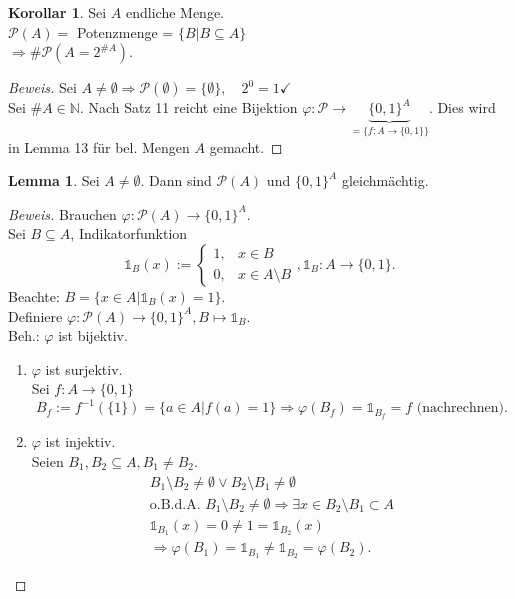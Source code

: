 \documentclass[12pt,a4paper,titlepage]{article} %
\theoremstyle{definition}
\newtheorem{kor}[satz]{Korollar}
\newtheorem{lem}[satz]{Lemma}
\theoremstyle{remark}
\newenvironment{bew}{\begin{proof}[Beweis]}{\end{proof}}
\newcommand{\N}{\mathbb{N}}
\begin{document}
\begin{kor}
	Sei \(A\) endliche Menge. \\
	\(\mathcal{P}(A) = \) Potenzmenge = \(\{B | B \subseteq A\}\)\\
	\(\Rightarrow \#\mathcal{P}(A = 2^{\#A}) \).
\end{kor}
\begin{bew}
	Sei \(A\neq \emptyset \Rightarrow\mathcal{P}(\emptyset) = \{\emptyset\}, \quad 2^0 = 1 \checkmark \)\\
	Sei \(\#A \in\N\). Nach Satz 11 reicht eine Bijektion \( \varphi : \mathcal{P} \rightarrow \underbrace{\{0,1\}^A}_{= \{f: A \rightarrow \{0,1 \} \}} \). Dies wird in Lemma 13 für bel. Mengen \(A\) gemacht.
\end{bew}
\begin{lem}
	Sei \(A\neq\emptyset\). Dann sind \( \mathcal{P}(A) \) und \(\{0,1\}^A\) gleichmächtig.
\end{lem}
\begin{bew}
	Brauchen \(\varphi : \mathcal{P}(A) \rightarrow \{0,1\}^A \).\\
	Sei \(B \subseteq A \), Indikatorfunktion \[ \mathds{1}_B(x) := \begin{cases} 
	1, &x\in B\\
	0, &x\in A\setminus B
	\end{cases}
	, \mathds{1}_B : A \rightarrow \{0,1\}. \]
	Beachte: \(B = \{x\in A | \mathds{1}_B(x) = 1 \} \).\\
	Definiere \( \varphi : \mathcal{P}(A) \rightarrow \{0,1\}^A, B \mapsto \mathds{1}_B \).\\
	Beh.: \(\varphi\) ist bijektiv.
	\begin{enumerate}
		\item \( \varphi \) ist surjektiv.\\
		Sei \(f: A\rightarrow \{0,1\}\)
		\[ B_f := f^{-1} (\{1\}) = \{a \in A| f(a) = 1 \} \Rightarrow \varphi(B_f) = \mathds{1}_{B_f} = f\text{ (nachrechnen)}.\]
		\item \( \varphi \) ist injektiv.\\
		Seien \( B_1,B_2\subseteq A, B_1 \neq B_2 \).
		\begin{align*}
			B_1\setminus B_2 \neq \emptyset \vee B_2\setminus B_1 \neq \emptyset\\
			\text{o.B.d.A. } B_1 \setminus B_2 \neq \emptyset \Rightarrow \exists x \in B_2 \setminus B_1 \subset A\\
			\mathds{1}_{B_1}(x) = 0 \neq 1 = \mathds{1}_{B_2}(x)\\
			\Rightarrow \varphi(B_1) = \mathds{1}_{B_1} \neq \mathds{1}_{B_2} = \varphi(B_2).
		\end{align*}
	\end{enumerate}
\end{bew}
\end{document}
